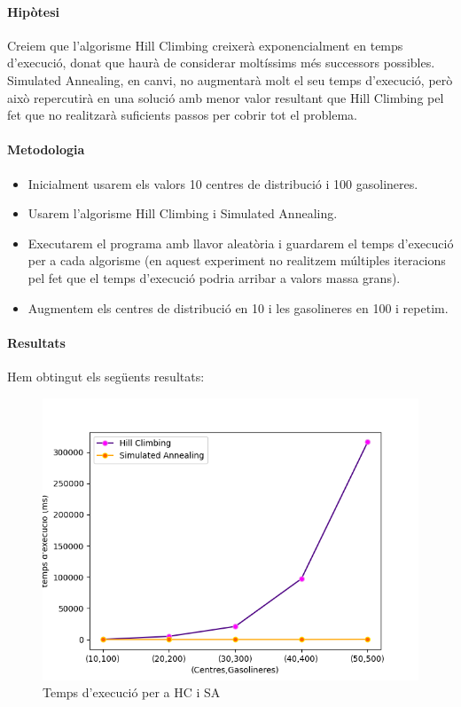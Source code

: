 \documentclass[a4paper]{article}
\begin{document}
\paragraph{Hipòtesi} Creiem que l'algorisme Hill Climbing creixerà exponencialment en temps d'execució, donat que haurà de considerar moltíssims més successors possibles. Simulated Annealing, en canvi, no augmentarà molt el seu temps d'execució, però això repercutirà en una solució amb menor valor resultant que Hill Climbing pel fet que no realitzarà suficients passos per cobrir tot el problema.
\paragraph{Metodologia}
\begin{itemize}
\item Inicialment usarem els valors 10 centres de distribució i 100 gasolineres.
\item Usarem l'algorisme Hill Climbing i Simulated Annealing.
\item Executarem el programa amb llavor aleatòria i guardarem el temps d'execució per a cada algorisme (en aquest experiment no realitzem múltiples iteracions pel fet que el temps d'execució podria arribar a valors massa grans).
\item Augmentem els centres de distribució en 10 i les gasolineres en 100 i repetim.
\end{itemize}
\paragraph{Resultats} Hem obtingut els següents resultats:

\begin{figure}[htp]
\centering
\includegraphics[scale=0.90]{images/experiment4.png}
\caption{Temps d'execució per a HC i SA}
\centering
\end{figure}
\end{document}
